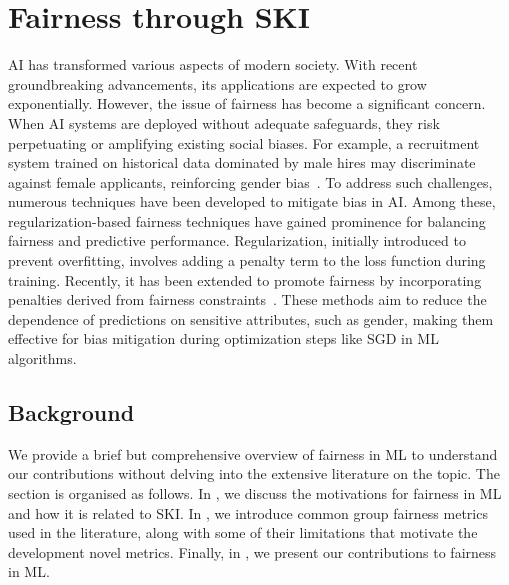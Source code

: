 
\chapter[Fairness through SKI]{Fairness through \gls{SKI}}
\label{ch:fairness-through-ski}
\minitoc

\Gls{AI} has transformed various aspects of modern society.
%
With recent groundbreaking advancements, its applications are expected to grow exponentially.
%
However, the issue of fairness has become a significant concern.
%
When \gls{AI} systems are deployed without adequate safeguards, they risk perpetuating or amplifying existing social biases.
%
For example, a recruitment system trained on historical data dominated by male hires may discriminate against female applicants, reinforcing gender bias~\cite{kochling2020genderbias}.
%
To address such challenges, numerous techniques have been developed to mitigate bias in \gls{AI}.
%
Among these, regularization-based fairness techniques have gained prominence for balancing fairness and predictive performance.
%
Regularization, initially introduced to prevent overfitting, involves adding a penalty term to the loss function during training.
%
Recently, it has been extended to promote fairness by incorporating penalties derived from fairness constraints~\cite{kamishima2011fairness}.
%
These methods aim to reduce the dependence of predictions on sensitive attributes, such as gender, making them effective for bias mitigation during optimization steps like \gls{SGD} in \gls{ML} algorithms.
%

\section{Background}\label{sec:fairness-background}
%
We provide a brief but comprehensive overview of fairness in \gls{ML} to understand our contributions without delving into the extensive literature on the topic.
%
The section is organised as follows.
%
In , we discuss the motivations for fairness in \gls{ML} and how it is related to \gls{SKI}.
%
In , we introduce common group fairness metrics used in the literature, along with some of their limitations that motivate the development novel metrics.
%
Finally, in , we present our contributions to fairness in \gls{ML}.


